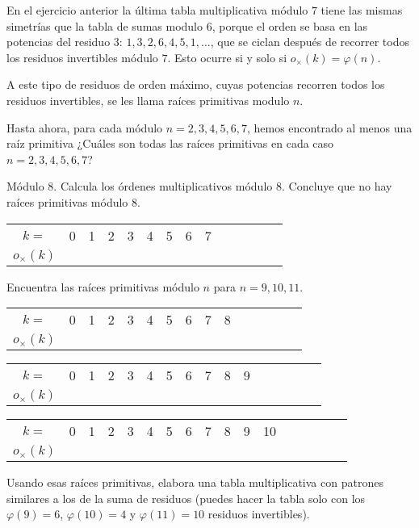 En el ejercicio anterior la última tabla multiplicativa módulo $7$ tiene las mismas simetrías que la tabla de sumas modulo $6$, porque el orden se basa en las potencias del residuo $3$: $1,3,2,6,4,5,1,\dots $, que se ciclan después de recorrer todos los residuos invertibles módulo $7$. Esto ocurre si y solo si $o_{\times}(k)=\varphi(n)$.

A este tipo de residuos de orden máximo, cuyas potencias recorren todos los residuos invertibles, se les llama raíces primitivas modulo $n$.

\begin{ejercicio}
Hasta ahora, para cada módulo $n=2,3,4,5,6,7$, hemos encontrado al menos una raíz primitiva ¿Cuáles son todas las raíces primitivas en cada caso $n=2,3,4,5,6,7$?
\end{ejercicio}

\begin{ejercicio}
Módulo $8$. Calcula los órdenes multiplicativos módulo $8$. Concluye que no hay raíces primitivas módulo $8$.

\begin{tabular}{c||c|c|c|c|c|c|c|c|c|c|c|c|c|}
    $k=$ & 0 & 1 & 2 & 3 & 4 & 5 & 6 & 7 \\
    $o_{\times}(k)$ & &&&&&& & 
\end{tabular}

\end{ejercicio}

\begin{ejercicio}
Encuentra las raíces primitivas módulo $n$ para $n=9, 10, 11$.

\begin{tabular}{c||c|c|c|c|c|c|c|c|c|c|c|c|c|c|}
    $k=$ & 0 & 1 & 2 & 3 & 4 & 5 & 6 & 7 & 8 \\
    $o_{\times}(k)$ & &&&&&& & &
\end{tabular}

\begin{tabular}{c||c|c|c|c|c|c|c|c|c|c|c|c|c|c|c|}
    $k=$ & 0 & 1 & 2 & 3 & 4 & 5 & 6 & 7 & 8 & 9 \\
    $o_{\times}(k)$ & &&&&&& & & &
\end{tabular}

\begin{tabular}{c||c|c|c|c|c|c|c|c|c|c|c|c|c|c|c|c|}
    $k=$ & 0 & 1 & 2 & 3 & 4 & 5 & 6 & 7 & 8 & 9 & 10 \\
    $o_{\times}(k)$ & &&&&&& & & & &
\end{tabular}

Usando esas raíces primitivas, elabora una tabla multiplicativa con patrones similares a los de la suma de residuos (puedes hacer la tabla solo con los $\varphi(9)=6$, $\varphi(10)=4$ y $\varphi(11)=10$ residuos invertibles).
\end{ejercicio}

